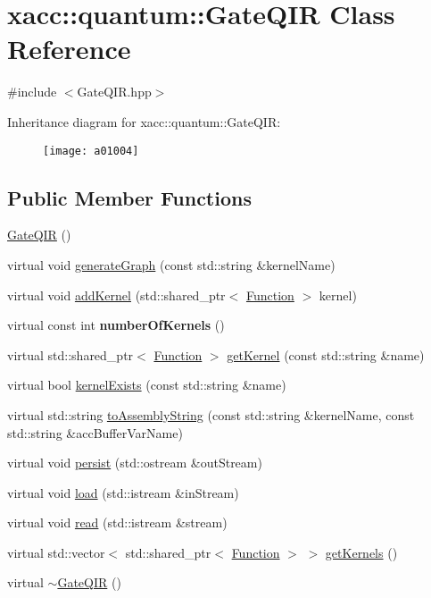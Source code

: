 \hypertarget{a01004}{}\section{xacc\+:\+:quantum\+:\+:Gate\+Q\+IR Class Reference}
\label{a01004}


{\ttfamily \#include $<$Gate\+Q\+I\+R.\+hpp$>$}

Inheritance diagram for xacc\+:\+:quantum\+:\+:Gate\+Q\+IR\+:\begin{figure}[H]
\begin{center}
\leavevmode
\texttt{[image: a01004]}
\end{center}
\end{figure}
\subsection*{Public Member Functions}
\begin{DoxyCompactItemize}
\item 
\hyperlink{a01004_afb99f610a6b123538c659169c131a634}{Gate\+Q\+IR} ()
\item 
virtual void \hyperlink{a01004_ad1ddd6105346dd9fc78648fd812285ed}{generate\+Graph} (const std\+::string \&kernel\+Name)
\item 
virtual void \hyperlink{a01004_aa6ed2cf2cbcfec8105c327a4fa95346f}{add\+Kernel} (std\+::shared\+\_\+ptr$<$ \hyperlink{a01124}{Function} $>$ kernel)
\item 
\mbox{\label{a01004_aca6be85526b14f500e7f98954dd6da5c}} 
virtual const int {\bfseries number\+Of\+Kernels} ()
\item 
virtual std\+::shared\+\_\+ptr$<$ \hyperlink{a01124}{Function} $>$ \hyperlink{a01004_a194758b6edcc3ae0c7fe8004f9bfe690}{get\+Kernel} (const std\+::string \&name)
\item 
virtual bool \hyperlink{a01004_a692f95099caa7c024110a3f035941dca}{kernel\+Exists} (const std\+::string \&name)
\item 
virtual std\+::string \hyperlink{a01004_a7153f7e9f516d43af3d5d4f95d60bd86}{to\+Assembly\+String} (const std\+::string \&kernel\+Name, const std\+::string \&acc\+Buffer\+Var\+Name)
\item 
virtual void \hyperlink{a01004_a40e1d07e4dfd3794ef53fca3cdbdca61}{persist} (std\+::ostream \&out\+Stream)
\item 
virtual void \hyperlink{a01004_a07f26eeb362ac480d20da6cdc8c8fb39}{load} (std\+::istream \&in\+Stream)
\item 
virtual void \hyperlink{a01004_a26019e2f1e13e64645e29aee86ac58b1}{read} (std\+::istream \&stream)
\item 
virtual std\+::vector$<$ std\+::shared\+\_\+ptr$<$ \hyperlink{a01124}{Function} $>$ $>$ \hyperlink{a01004_a4ace7ee5ebef84b1f39aaf5ed12c6cc6}{get\+Kernels} ()
\item 
virtual \hyperlink{a01004_ac88db03f1dd29e2d36aaa6c01a130008}{$\sim$\+Gate\+Q\+IR} ()
\end{DoxyCompactItemize}
